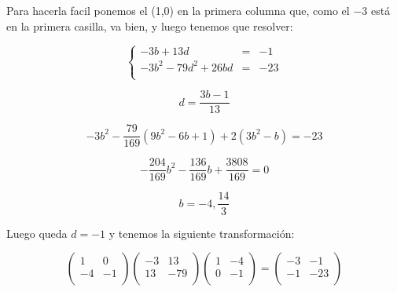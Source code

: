 \documentclass[12pt]{amsart}
\newcommand{\lp}{\left(}
\newcommand{\rp}{\right)}
\theoremstyle{plain}
\begin{document}
Para hacerla facil ponemos el (1,0) en la primera columna que,
como el $-3$ está en la primera casilla, va bien, y luego 
tenemos que resolver:

$$\left\{
\begin{matrix}
    -3b+13d &=&-1 \\
    -3b^2-79d^2+26bd &=&-23 \\
\end{matrix}\right.$$

$$d=\frac{3b-1}{13}$$

$$-3b^2-\frac{79}{169}(9b^2-6b+1)+2(3b^2-b)=-23$$

$$-\frac{204}{169}b^2-\frac{136}{169}b+\frac{3808}{169}=0$$

$$b=-4, \frac{14}{3}$$

Luego queda $d=-1$ y tenemos la siguiente transformación:

$$\lp\begin{matrix}
    1&0 \\
    -4&-1 \\
\end{matrix}\rp
\lp\begin{matrix}
    -3&13 \\
    13&-79 \\
\end{matrix}\rp
\lp\begin{matrix}
    1&-4 \\
    0&-1 \\
\end{matrix}\rp = 
\lp\begin{matrix}
    -3&-1 \\
    -1&-23 \\
\end{matrix}\rp$$
\end{document}
